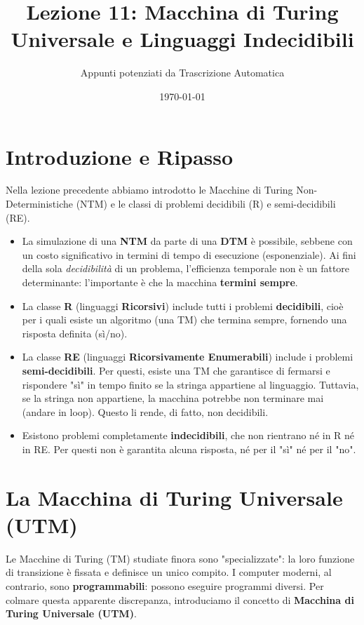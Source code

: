 \documentclass[a4paper]{article}
\title{Lezione 11: Macchina di Turing Universale e Linguaggi Indecidibili}
\author{Appunti potenziati da Trascrizione Automatica}
\date{\today}
\theoremstyle{definition} %
\theoremstyle{remark} %
\begin{document}
\maketitle
\tableofcontents
\newpage

\section{Introduzione e Ripasso}

Nella lezione precedente abbiamo introdotto le Macchine di Turing Non-Deterministiche (NTM) e le classi di problemi decidibili (R) e semi-decidibili (RE).

\begin{itemize}
    \item La simulazione di una \textbf{NTM} da parte di una \textbf{DTM} è possibile, sebbene con un costo significativo in termini di tempo di esecuzione (esponenziale). Ai fini della sola \textit{decidibilità} di un problema, l'efficienza temporale non è un fattore determinante: l'importante è che la macchina \textbf{termini sempre}.
    \item La classe \textbf{R} (linguaggi \textbf{Ricorsivi}) include tutti i problemi \textbf{decidibili}, cioè per i quali esiste un algoritmo (una TM) che termina sempre, fornendo una risposta definita (sì/no).
    \item La classe \textbf{RE} (linguaggi \textbf{Ricorsivamente Enumerabili}) include i problemi \textbf{semi-decidibili}. Per questi, esiste una TM che garantisce di fermarsi e rispondere "sì" in tempo finito se la stringa appartiene al linguaggio. Tuttavia, se la stringa non appartiene, la macchina potrebbe non terminare mai (andare in loop). Questo li rende, di fatto, non decidibili.
    \item Esistono problemi completamente \textbf{indecidibili}, che non rientrano né in R né in RE. Per questi non è garantita alcuna risposta, né per il "sì" né per il "no".
\end{itemize}

\section{La Macchina di Turing Universale (UTM)}

Le Macchine di Turing (TM) studiate finora sono "specializzate": la loro funzione di transizione è fissata e definisce un unico compito. I computer moderni, al contrario, sono \textbf{programmabili}: possono eseguire programmi diversi. Per colmare questa apparente discrepanza, introduciamo il concetto di \textbf{Macchina di Turing Universale (UTM)}.
\end{document}
